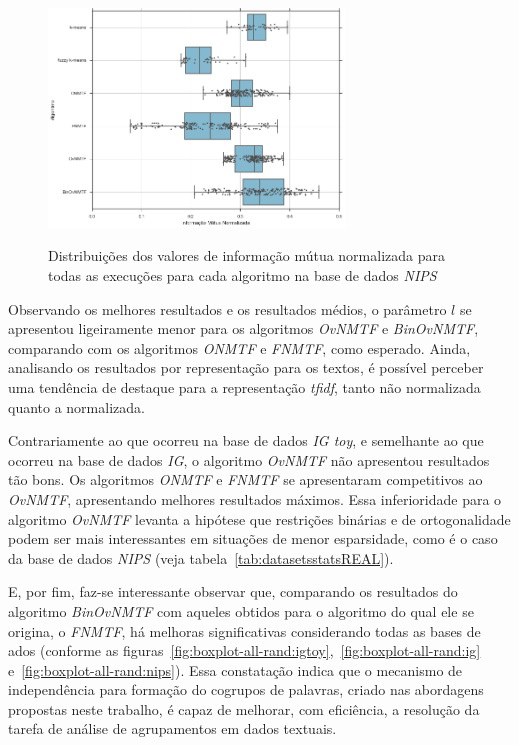 \documentclass[
    12pt,                %
    oneside,            %
    a4paper,            %
    english,            %
    brazil                %
    ]{abntex2ppgsi}
\begin{document}
\begin{figure}[H]
    \centering
    \caption{Distribuições dos valores de informação mútua normalizada para todas as execuções para cada algoritmo na base de dados \textit{NIPS}}
    \includegraphics[width=0.7\textwidth]{img/boxplot-all-nmi-nips.png}
    \label{fig:boxplot-all-nmi:nips}
\end{figure}

Observando os melhores resultados e os resultados médios, o parâmetro $l$ se apresentou ligeiramente menor para os algoritmos \textit{OvNMTF} e \textit{BinOvNMTF}, comparando com os algoritmos \textit{ONMTF} e \textit{FNMTF}, como esperado. Ainda, analisando os resultados por representação para os textos, é possível perceber uma tendência de destaque para a representação \textit{tfidf}, tanto não normalizada quanto a normalizada.


Contrariamente ao que ocorreu na base de dados \textit{IG toy}, e semelhante ao que ocorreu na base de dados \textit{IG}, o algoritmo \textit{OvNMTF} não apresentou resultados tão bons.
Os algoritmos \textit{ONMTF} e \textit{FNMTF} se apresentaram competitivos ao \textit{OvNMTF}, apresentando melhores resultados máximos.
Essa inferioridade para o algoritmo \textit{OvNMTF} levanta a hipótese que restrições binárias e de ortogonalidade podem ser mais interessantes em situações de menor esparsidade, como é o caso da base de dados \textit{NIPS} (veja tabela~\ref{tab:datasetsstatsREAL}).

E, por fim, faz-se interessante observar que, comparando os resultados do algoritmo \textit{BinOvNMTF} com aqueles obtidos para o algoritmo do qual ele se origina, o \textit{FNMTF}, há melhoras significativas considerando todas as bases de ados (conforme as figuras~\ref{fig:boxplot-all-rand:igtoy},~\ref{fig:boxplot-all-rand:ig} e~\ref{fig:boxplot-all-rand:nips}).
Essa constatação indica que o mecanismo de independência para formação do cogrupos de palavras, criado nas abordagens propostas neste trabalho, é capaz de melhorar, com eficiência, a resolução da tarefa de análise de agrupamentos em dados textuais.
\end{document}
